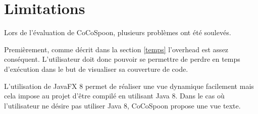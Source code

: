 \section{Limitations}

Lors de l'évaluation de CoCoSpoon, plusieurs problèmes ont été soulevés. \\  
\par Premièrement, comme décrit dans la section \ref{temps} l'overhead est assez conséquent. L'utilisateur doit donc pouvoir se permettre de perdre en temps d'exécution dans le but de visualiser sa couverture de code.
\par L'utilisation de JavaFX 8 permet de réaliser une vue dynamique facilement mais cela impose au projet d'être compilé en utilisant Java 8. Dans le cas où l'utilisateur ne désire pas utiliser Java 8, CoCoSpoon propose une vue texte. 